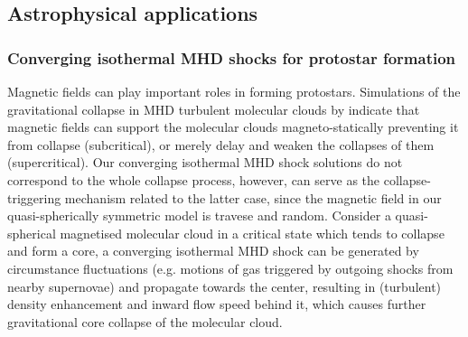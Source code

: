 \documentclass[fleqn,usenatbib]{mnras}
\begin{document}
\subsection{Astrophysical applications}
\label{s6.2}
\subsubsection{Converging isothermal MHD shocks for protostar formation}
\label{s6.2.1}


Magnetic fields can play important roles in forming protostars. Simulations of the gravitational collapse in MHD turbulent molecular clouds by \citet{heitsch2001gravitational} indicate that magnetic fields can support the molecular clouds magneto-statically preventing it from collapse (subcritical), or merely delay and weaken the collapses of them (supercritical). Our converging isothermal MHD shock solutions do not correspond to the whole collapse process, however, can serve as the collapse-triggering mechanism related to the latter case, since the magnetic field in our quasi-spherically symmetric model is travese and random. Consider a quasi-spherical magnetised molecular cloud in a critical state which tends to collapse and form a core, a converging isothermal MHD shock can be generated by circumstance fluctuations (e.g. motions of gas triggered by outgoing shocks from nearby supernovae) and propagate towards the center, resulting in (turbulent) density enhancement and inward flow speed behind it, which causes further gravitational core collapse of the molecular cloud. 
\end{document}
